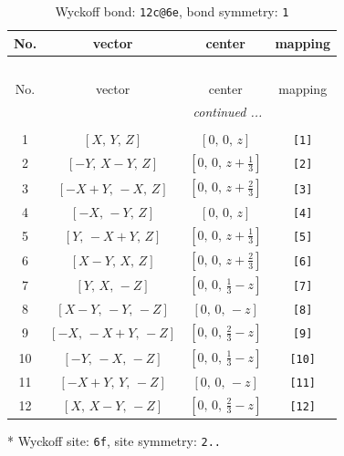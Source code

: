 \documentclass[fleqn,8pt]{jsarticle}
\begin{document}
\begin{longtable}{cccc}
\caption{Wyckoff bond: {\tt 12c@6e}, bond symmetry: {\tt 1}}
 \\
 \hline \hline
No. & vector & center & mapping \\ \hline \endfirsthead

\multicolumn{3}{l}{\tablename\ \thetable{}} \\
 \hline \hline
No. & vector & center & mapping \\ \hline \endhead

 \hline \hline
\multicolumn{3}{r}{\footnotesize\it continued ...} \\ \endfoot

 \hline \hline
\multicolumn{3}{r}{} \\ \endlastfoot

1 & $\left[ X,\, Y,\, Z \right]$ & $\left[ 0,\, 0,\, z \right]$ & {\tt [1]} \\ \hline
2 & $\left[ - Y,\, X - Y,\, Z \right]$ & $\left[ 0,\, 0,\, z + \frac{1}{3} \right]$ & {\tt [2]} \\ \hline
3 & $\left[ - X + Y,\, - X,\, Z \right]$ & $\left[ 0,\, 0,\, z + \frac{2}{3} \right]$ & {\tt [3]} \\ \hline
4 & $\left[ - X,\, - Y,\, Z \right]$ & $\left[ 0,\, 0,\, z \right]$ & {\tt [4]} \\ \hline
5 & $\left[ Y,\, - X + Y,\, Z \right]$ & $\left[ 0,\, 0,\, z + \frac{1}{3} \right]$ & {\tt [5]} \\ \hline
6 & $\left[ X - Y,\, X,\, Z \right]$ & $\left[ 0,\, 0,\, z + \frac{2}{3} \right]$ & {\tt [6]} \\ \hline
7 & $\left[ Y,\, X,\, - Z \right]$ & $\left[ 0,\, 0,\, \frac{1}{3} - z \right]$ & {\tt [7]} \\ \hline
8 & $\left[ X - Y,\, - Y,\, - Z \right]$ & $\left[ 0,\, 0,\, - z \right]$ & {\tt [8]} \\ \hline
9 & $\left[ - X,\, - X + Y,\, - Z \right]$ & $\left[ 0,\, 0,\, \frac{2}{3} - z \right]$ & {\tt [9]} \\ \hline
10 & $\left[ - Y,\, - X,\, - Z \right]$ & $\left[ 0,\, 0,\, \frac{1}{3} - z \right]$ & {\tt [10]} \\ \hline
11 & $\left[ - X + Y,\, Y,\, - Z \right]$ & $\left[ 0,\, 0,\, - z \right]$ & {\tt [11]} \\ \hline
12 & $\left[ X,\, X - Y,\, - Z \right]$ & $\left[ 0,\, 0,\, \frac{2}{3} - z \right]$ & {\tt [12]} \\
\end{longtable}
* Wyckoff site: {\tt 6f}, site symmetry: {\tt 2..}
\end{document}
